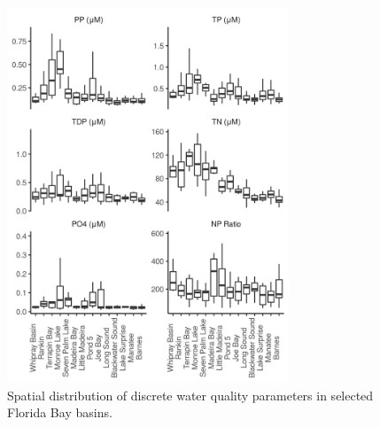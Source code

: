 \clearpage

\begin{figure}
  \centering
  \includegraphics[width=0.75\textwidth]{../../figures/nonchlboxplot.png}
  \caption{Spatial distribution of discrete water quality parameters in selected Florida Bay basins.}
  \label{fig:5}
\end{figure}

\newpage

